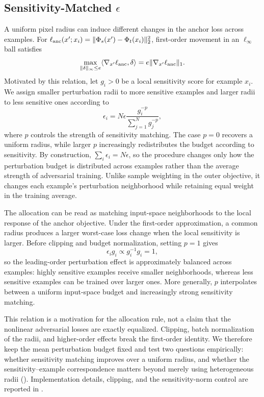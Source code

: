 \documentclass{article} %
\theoremstyle{plain}
\begin{document}
\subsection{Sensitivity-Matched \(\epsilon\)}
\label{sec:angeps}
A uniform pixel radius can induce different changes in the anchor loss across
examples. For
\(\ell_{\rm anc}(x';x_i)=\|\Phi_s(x')-\Phi_t(x_i)\|_2^2\), first-order
movement in an \(\ell_\infty\) ball satisfies
\begin{equation}
\max_{\|\delta\|_\infty\le e}\langle\nabla_{x'}\ell_{\rm anc},\delta\rangle
=e\|\nabla_{x'}\ell_{\rm anc}\|_1.
\label{eqn:firstorder}
\end{equation}
Motivated by this relation, let \(g_i>0\) be a local sensitivity score for
example \(x_i\). We assign smaller perturbation radii to more sensitive
examples and larger radii to less sensitive ones according to
\begin{equation}
\epsilon_i=N\epsilon\frac{g_i^{-p}}{\sum_{j=1}^N g_j^{-p}},
\label{eqn:angeps_ideal}
\end{equation}
where \(p\) controls the strength of sensitivity matching. The case \(p=0\)
recovers a uniform radius, while larger \(p\) increasingly redistributes the
budget according to sensitivity. By construction,
\(\sum_i\epsilon_i=N\epsilon\), so the procedure changes only how the
perturbation budget is distributed across examples rather than the average
strength of adversarial training. Unlike sample weighting in the outer
objective, it changes each example's perturbation neighborhood while retaining
equal weight in the training average.

The allocation can be read as matching input-space neighborhoods to the
local response of the anchor objective. Under the first-order approximation,
a common radius produces a larger worst-case loss change when the local
sensitivity is larger. Before clipping and budget normalization, setting
\(p=1\) gives
\begin{equation}
  \epsilon_i g_i \propto g_i^{-1}g_i = 1,
\label{eqn:sensitivity_balance}
\end{equation}
so the leading-order perturbation effect is approximately balanced across
examples: highly sensitive examples receive smaller neighborhoods, whereas
less sensitive examples can be trained over larger ones. More generally,
\(p\) interpolates between a uniform input-space budget and increasingly
strong sensitivity matching.

This relation is a motivation for the allocation rule, not a claim that the
nonlinear adversarial losses are exactly equalized. Clipping, batch
normalization of the radii, and higher-order effects break the first-order
identity. We therefore keep the mean perturbation budget fixed and test two
questions empirically: whether sensitivity matching improves over a uniform
radius, and whether the sensitivity--example correspondence matters beyond
merely using heterogeneous radii ().
Implementation details, clipping, and the sensitivity-norm control are
reported in .
\end{document}
